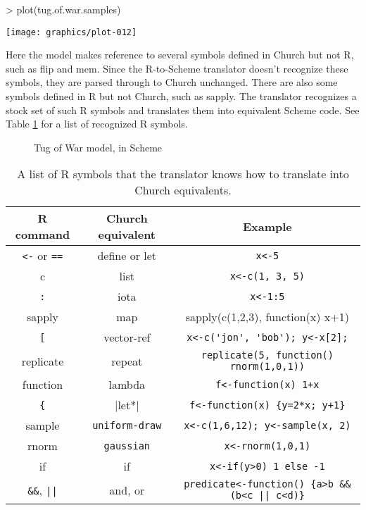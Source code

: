 \documentclass[12pt]{article}
\newcommand{\church}{Church\xspace}
\newcommand{\R}{R\xspace}
\begin{document}
\begin{center}
\begin{Schunk}
\begin{Sinput}
> plot(tug.of.war.samples)
\end{Sinput}
\end{Schunk}
\texttt{[image: graphics/plot-012]}
\end{center}

Here the model makes reference to several symbols defined in \church but not \R, such as flip and mem. Since the R-to-Scheme translator doesn't recognize these symbols, they are parsed through to \church unchanged. There are also some symbols defined in \R but not \church, such as sapply. The translator recognizes a stock set of such \R symbols and translates them into equivalent Scheme code. See Table \ref{table:RtoScheme} for a list of recognized R symbols.

\begin{figure}
\lstset{language=lisp}

\caption{Tug of War model, in Scheme}
\label{fig:tugofwar}
\end{figure}

\begin{table}
\begin{tabular}{ccc}
\R command & Church equivalent & Example\\
\hline
\verb|<-| or \verb|==| & define or let & \verb|x<-5|\\
c & list & \verb|x<-c(1, 3, 5)|\\
\verb|:| & iota & \verb|x<-1:5|\\
sapply & map & sapply(c(1,2,3), function(x) x+1)\\
\verb|[| & vector-ref & \verb|x<-c('jon', 'bob'); y<-x[2];|\\
replicate & repeat & \verb|replicate(5, function() rnorm(1,0,1))|\\
function & lambda & \verb|f<-function(x) 1+x|\\
\verb|{| & |let*| & \verb|f<-function(x) {y=2*x; y+1}|\\
sample & \verb|uniform-draw| & \verb|x<-c(1,6,12); y<-sample(x, 2)|\\
rnorm & \verb|gaussian| & \verb|x<-rnorm(1,0,1)|\\
if & if & \verb|x<-if(y>0) 1 else -1|\\
\verb|&&|, \verb=||= & and, or & \verb=predicate<-function() {a>b && (b<c || c<d)}=
\end{tabular}
\caption{A list of R symbols that the translator knows how to translate into Church equivalents.}
\label{table:RtoScheme}
\end{table}
\end{document}
